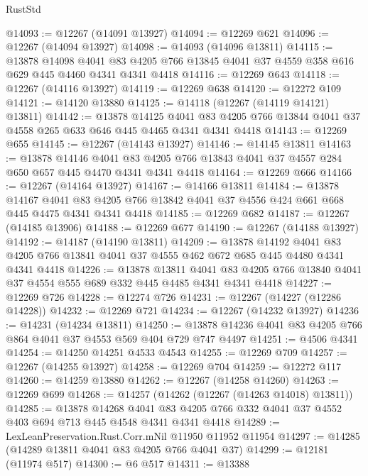 \begin{lexlean}{RustStd}
\begin{coremodule}
@14093 := @12267 (@14091 @13927)
@14094 := @12269 @621
@14096 := @12267 (@14094 @13927)
@14098 := @14093 (@14096 @13811)
@14115 := @13878
    @14098
    @4041
    @83
    @4205
    @766
    @13845
    @4041
    @37
    @4559
    @358
    @616
    @629
    @445
    @4460
    @4341
    @4341
    @4418
@14116 := @12269 @643
@14118 := @12267 (@14116 @13927)
@14119 := @12269 @638
@14120 := @12272 @109
@14121 := @14120 @13880
@14125 := @14118 (@12267 (@14119 @14121) @13811)
@14142 := @13878
    @14125
    @4041
    @83
    @4205
    @766
    @13844
    @4041
    @37
    @4558
    @265
    @633
    @646
    @445
    @4465
    @4341
    @4341
    @4418
@14143 := @12269 @655
@14145 := @12267 (@14143 @13927)
@14146 := @14145 @13811
@14163 := @13878
    @14146
    @4041
    @83
    @4205
    @766
    @13843
    @4041
    @37
    @4557
    @284
    @650
    @657
    @445
    @4470
    @4341
    @4341
    @4418
@14164 := @12269 @666
@14166 := @12267 (@14164 @13927)
@14167 := @14166 @13811
@14184 := @13878
    @14167
    @4041
    @83
    @4205
    @766
    @13842
    @4041
    @37
    @4556
    @424
    @661
    @668
    @445
    @4475
    @4341
    @4341
    @4418
@14185 := @12269 @682
@14187 := @12267 (@14185 @13906)
@14188 := @12269 @677
@14190 := @12267 (@14188 @13927)
@14192 := @14187 (@14190 @13811)
@14209 := @13878
    @14192
    @4041
    @83
    @4205
    @766
    @13841
    @4041
    @37
    @4555
    @462
    @672
    @685
    @445
    @4480
    @4341
    @4341
    @4418
@14226 := @13878
    @13811
    @4041
    @83
    @4205
    @766
    @13840
    @4041
    @37
    @4554
    @555
    @689
    @332
    @445
    @4485
    @4341
    @4341
    @4418
@14227 := @12269 @726
@14228 := @12274 @726
@14231 := @12267 (@14227 (@12286 @14228))
@14232 := @12269 @721
@14234 := @12267 (@14232 @13927)
@14236 := @14231 (@14234 @13811)
@14250 := @13878 @14236 @4041 @83 @4205 @766 @864 @4041 @37 @4553 @569 @404 @729 @747 @4497
@14251 := @4506 @4341
@14254 := @14250 @14251 @4533 @4543
@14255 := @12269 @709
@14257 := @12267 (@14255 @13927)
@14258 := @12269 @704
@14259 := @12272 @117
@14260 := @14259 @13880
@14262 := @12267 (@14258 @14260)
@14263 := @12269 @699
@14268 := @14257 (@14262 (@12267 (@14263 @14018) @13811))
@14285 := @13878
    @14268
    @4041
    @83
    @4205
    @766
    @332
    @4041
    @37
    @4552
    @403
    @694
    @713
    @445
    @4548
    @4341
    @4341
    @4418
@14289 := LexLeanPreservation.Rust.Corr.mNil @11950 @11952 @11954
@14297 := @14285 (@14289 @13811 @4041 @83 @4205 @766 @4041 @37)
@14299 := @12181 (@11974 @517)
@14300 := @6 @517
@14311 := @13388

\end{coremodule}
\end{lexlean}
